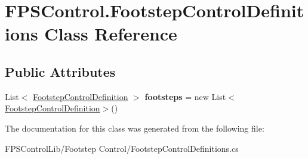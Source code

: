 \hypertarget{class_f_p_s_control_1_1_footstep_control_definitions}{\section{F\-P\-S\-Control.\-Footstep\-Control\-Definitions Class Reference}
\label{class_f_p_s_control_1_1_footstep_control_definitions}
}
\subsection*{Public Attributes}
\begin{DoxyCompactItemize}
\item 
\hypertarget{class_f_p_s_control_1_1_footstep_control_definitions_ae7cb402b15807336c17d2751286d8ec2}{List$<$ \hyperlink{class_f_p_s_control_1_1_footstep_control_definition}{Footstep\-Control\-Definition} $>$ {\bfseries footsteps} = new List$<$\hyperlink{class_f_p_s_control_1_1_footstep_control_definition}{Footstep\-Control\-Definition}$>$()}\label{class_f_p_s_control_1_1_footstep_control_definitions_ae7cb402b15807336c17d2751286d8ec2}

\end{DoxyCompactItemize}


The documentation for this class was generated from the following file\-:\begin{DoxyCompactItemize}
\item 
F\-P\-S\-Control\-Lib/\-Footstep Control/Footstep\-Control\-Definitions.\-cs\end{DoxyCompactItemize}
